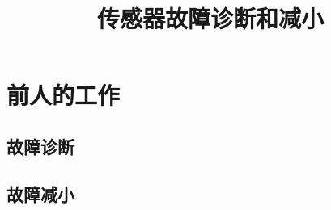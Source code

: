\documentclass{amsart}
\title{传感器故障诊断和减小}
\author{}
\date{}
\begin{document}
\section{前人的工作}

\subsection{故障诊断}



\subsection{故障减小}
\end{document}
